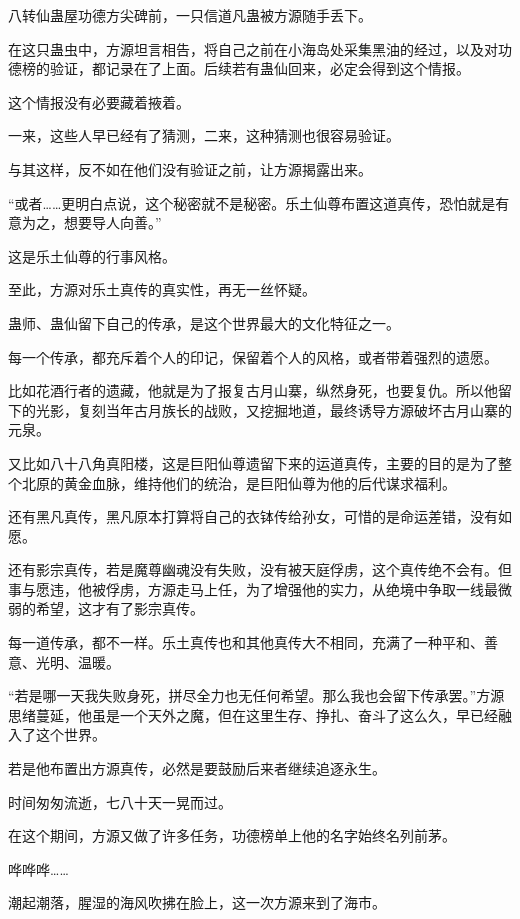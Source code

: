 
\begin{this_body}

八转仙蛊屋功德方尖碑前，一只信道凡蛊被方源随手丢下。

在这只蛊虫中，方源坦言相告，将自己之前在小海岛处采集黑油的经过，以及对功德榜的验证，都记录在了上面。后续若有蛊仙回来，必定会得到这个情报。

这个情报没有必要藏着掖着。

一来，这些人早已经有了猜测，二来，这种猜测也很容易验证。

与其这样，反不如在他们没有验证之前，让方源揭露出来。

“或者……更明白点说，这个秘密就不是秘密。乐土仙尊布置这道真传，恐怕就是有意为之，想要导人向善。”

这是乐土仙尊的行事风格。

至此，方源对乐土真传的真实性，再无一丝怀疑。

蛊师、蛊仙留下自己的传承，是这个世界最大的文化特征之一。

每一个传承，都充斥着个人的印记，保留着个人的风格，或者带着强烈的遗愿。

比如花酒行者的遗藏，他就是为了报复古月山寨，纵然身死，也要复仇。所以他留下的光影，复刻当年古月族长的战败，又挖掘地道，最终诱导方源破坏古月山寨的元泉。

又比如八十八角真阳楼，这是巨阳仙尊遗留下来的运道真传，主要的目的是为了整个北原的黄金血脉，维持他们的统治，是巨阳仙尊为他的后代谋求福利。

还有黑凡真传，黑凡原本打算将自己的衣钵传给孙女，可惜的是命运差错，没有如愿。

还有影宗真传，若是魔尊幽魂没有失败，没有被天庭俘虏，这个真传绝不会有。但事与愿违，他被俘虏，方源走马上任，为了增强他的实力，从绝境中争取一线最微弱的希望，这才有了影宗真传。

每一道传承，都不一样。乐土真传也和其他真传大不相同，充满了一种平和、善意、光明、温暖。

“若是哪一天我失败身死，拼尽全力也无任何希望。那么我也会留下传承罢。”方源思绪蔓延，他虽是一个天外之魔，但在这里生存、挣扎、奋斗了这么久，早已经融入了这个世界。

若是他布置出方源真传，必然是要鼓励后来者继续追逐永生。

时间匆匆流逝，七八十天一晃而过。

在这个期间，方源又做了许多任务，功德榜单上他的名字始终名列前茅。

哗哗哗……

潮起潮落，腥湿的海风吹拂在脸上，这一次方源来到了海市。


\end{this_body}
